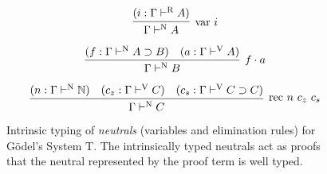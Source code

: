 \documentclass[preprint,nonatbib]{sigplanconf}
\numberwithin{subdefin}{defin}
\numberwithin{subtheorem}{theorem}
\def\arr{\supset}
\def\app{\cdot}
\def\nat{\mathbb{N}}
\newcommand{\turn}[1]{\vdash^\con{#1}}
\newcommand{\con}[1]{\textmd{#1}}
\newcommand{\fun}[1]{\textmd{#1}}
\newcommand{\typv}[1]{\Gamma \turn{V} #1}
\newcommand{\typn}[1]{\Gamma \turn{N} #1}
\newcommand{\typr}[1]{\Gamma \turn{R} #1}
\begin{document}
\begin{figure}
\caption{
Intrinsic typing of {\it neutrals} (variables and elimination rules) 
for G{\"o}del's System T.
The intrinsically typed neutrals act as proofs that the neutral
represented by the proof term is well typed.
}

$$
\infer
  [\fun{var} ~ i]
  {\typn{A}}
{
  (i : \typr{A})
}
$$

$$
\infer
  [f \app a]
  {\typn{B}}
{
  (f : \typn{A \arr B})
  &
  (a : \typv{A})
}
$$

$$
\infer
  [\fun{rec} ~ n ~ c_z ~ c_s]
  {\typn{C}}
{
  (n : \typn{\nat})
  &
  (c_z : \typv{C})
  &
  (c_s : \typv{C \arr C})
}
$$
\label{fig:typn}
\end{figure}
\end{document}
